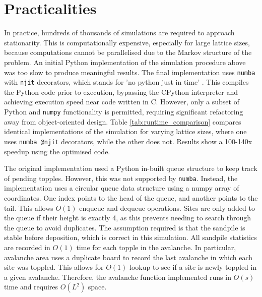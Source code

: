 \section{Practicalities}
In practice, hundreds of thousands of simulations are required to approach stationarity. This is computationally expensive, especially for large lattice sizes, because computations cannot be parallelised due to the Markov structure of the problem. 
An initial Python implementation of the simulation procedure above was too slow to produce meaningful results. The final implementation uses \texttt{numba} with \texttt{njit} decorators, which stands for 'no python just in time' \cite{lam2015numba}. This compiles the Python code prior to execution, bypassing the CPython interpreter and achieving execution speed near code written in C. However, only a subset of Python and \texttt{numpy} functionality is permitted, requiring significant refactoring away from object-oriented design. Table \ref{tab:runtime_comparison} compares identical implementations of the simulation for varying lattice sizes, where one uses \texttt{numba @njit} decorators, while the other does not. Results show a 100-140x speedup using the optimised code.

The original implementation used a Python in-built queue structure to keep track of pending topples. However, this was not supported by \texttt{numba}. Instead, the implementation uses a circular queue data structure using a numpy array of coordinates. One index points to the head of the queue, and another points to the tail. This allows $O(1)$ enqueue and dequeue operations. Sites are only added to the queue if their height is exactly 4, as this prevents needing to search through the queue to avoid duplicates. The assumption required is that the sandpile is stable before deposition, which is correct in this simulation. All sandpile statistics are recorded in $O(1)$ time for each topple in the avalanche. In particular, avalanche area uses a duplicate board to record the last avalanche in which each site was toppled. This allows for $O(1)$ lookup to see if a site is newly toppled in a given avalanche. Therefore, the avalanche function implemented runs in $O(s)$ time and requires $O(L^2)$ space.


